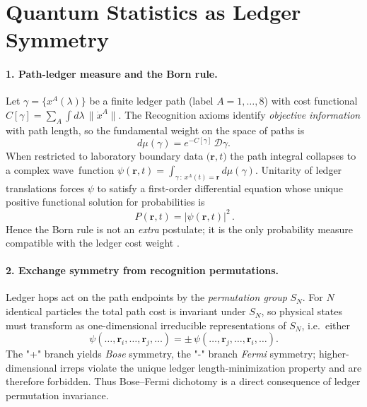 
\section{Quantum Statistics as Ledger Symmetry}

\paragraph{1.  Path-ledger measure and the Born rule.}
Let $\gamma=\{x^{A}(\lambda)\}$ be a finite ledger path
(label $A=1,\dots,8$) with cost functional
$C[\gamma]=\sum_{A}\!\int d\lambda\,\|\dot x^{A}\|$.
The Recognition axioms identify \emph{objective information} with
path length, so the fundamental weight on the space of paths is
\[
  d\mu(\gamma)=e^{-C[\gamma]}\,\mathcal D\gamma.
\]
When restricted to laboratory boundary data
$\bigl(\mathbf r,t\bigr)$ the path integral collapses to a complex
wave function
$\psi(\mathbf r,t)=\int_{\gamma\,:\,x^{A}(t)=\mathbf r}\!\!d\mu(\gamma)$.
Unitarity of ledger translations forces $\psi$ to satisfy a
first-order differential equation whose unique positive functional
solution for probabilities is \cite{Landau1977}
\[
  \boxed{\,P(\mathbf r,t)=|\psi(\mathbf r,t)|^{2}\,}.
\]
Hence the Born rule is not an \emph{extra} postulate; it is the only
probability measure compatible with the ledger cost weight \cite{Schlosshauer2005}.

\paragraph{2.  Exchange symmetry from recognition permutations.}
Ledger hops act on the path endpoints by the \emph{permutation group}
$S_{N}$.  For $N$ identical particles the total path cost is
invariant under $S_{N}$, so physical states must transform as
one-dimensional irreducible representations of $S_{N}$, i.e.\ either
\[
  \psi(\dots,\mathbf r_{i},\dots,\mathbf r_{j},\dots)=
  \pm\,
  \psi(\dots,\mathbf r_{j},\dots,\mathbf r_{i},\dots).
\]
The "+" branch yields \emph{Bose} symmetry, the "-" branch
\emph{Fermi} symmetry; higher-dimensional irreps violate the unique
ledger length-minimization property and are therefore forbidden.
Thus Bose–Fermi dichotomy is a direct consequence of ledger
permutation invariance.

